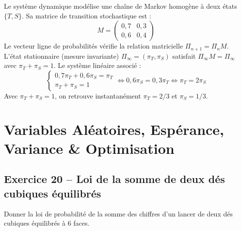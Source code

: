 \documentclass[11pt,a4paper]{article}
\begin{document}
\begin{remarquebox}
Le système dynamique modélise une chaîne de Markov homogène à deux états $\{T, S\}$.
Sa matrice de transition stochastique est :
\[
M = \begin{pmatrix} 0{,}7 & 0{,}3 \\ 0{,}6 & 0{,}4 \end{pmatrix}
\]
Le vecteur ligne de probabilités vérifie la relation matricielle $\Pi_{n+1} = \Pi_n M$.
L'état stationnaire (mesure invariante) $\Pi_\infty = (\pi_T, \pi_S)$ satisfait $\Pi_\infty M = \Pi_\infty$ avec $\pi_T + \pi_S = 1$.
Le système linéaire associé :
\[
\begin{cases} 0{,}7 \pi_T + 0{,}6 \pi_S = \pi_T \\ \pi_T + \pi_S = 1 \end{cases} \iff 0{,}6 \pi_S = 0{,}3 \pi_T \iff \pi_T = 2\pi_S
\]
Avec $\pi_T + \pi_S = 1$, on retrouve instantanément $\pi_T = 2/3$ et $\pi_S = 1/3$.
\end{remarquebox}

\vspace{0.4cm}

\section{Variables Aléatoires, Espérance, Variance \& Optimisation}

\subsection*{Exercice 20 -- Loi de la somme de deux dés cubiques équilibrés}

Donner la loi de probabilité de la somme des chiffres d'un lancer de deux dés cubiques équilibrés à 6 faces.
\end{document}

